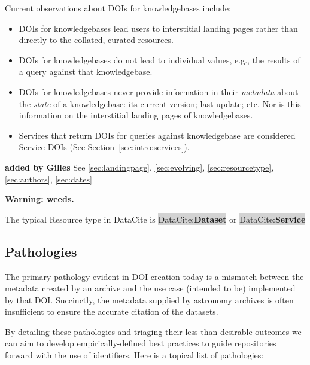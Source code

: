 \documentclass[11pt,a4paper]{ivoa}
\newcommand{\dataciteterm}[1]{\colorbox{lightgray}{DataCite:\textbf{#1}}}
\begin{document}
Current observations about DOIs for knowledgebases include:


\begin{itemize}
	\item DOIs for knowledgebases lead users to interstitial landing pages rather than directly to the collated, curated resources. 
	\item DOIs for knowledgebases do not lead to individual values, e.g., the results of a query against that knowledgebase.
	\item DOIs for knowledgebases never provide information in their \textit{metadata} about the \textit{state} of a knowledgebase: its current version; last update; etc. 
	Nor is this information on the interstitial landing pages of knowledgebases.
	\item Services that return DOIs for queries against knowledgebase are considered Service DOIs (See Section~\ref{sec:intro:services}).
\end{itemize}

\textbf{\color{red} added by Gilles}
See \ref{sec:landingpage}, \ref{sec:evolving}, \ref{sec:resourcetype}, \ref{sec:authors}, \ref{sec:dates}

\textbf{Warning: weeds.}

The typical Resource type in DataCite is \dataciteterm{Dataset} or \dataciteterm{Service}

\subsection{Pathologies}
\label{sec:use:patho}

The primary pathology evident in DOI creation today is a mismatch between the metadata created by an archive and the use case (intended to be) implemented by that DOI. 
Succinctly, the metadata supplied by astronomy archives is often insufficient to ensure the accurate citation of the datasets.

By detailing these pathologies and triaging their less-than-desirable outcomes we can aim to develop empirically-defined best practices to guide repositories forward with the use of identifiers.
Here is a topical list of pathologies:
\end{document}
